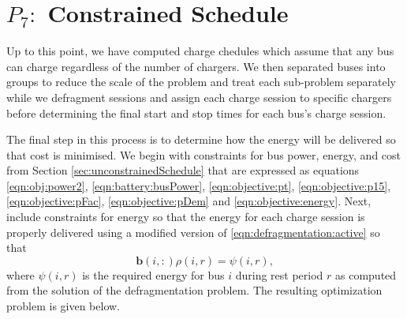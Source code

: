 \section{$P_7:$ Constrained Schedule\label{sec:constrainedSchedule}}
Up to this point, we have computed charge chedules which assume that any bus can charge regardless of the number of chargers. We then separated buses into groups to reduce the scale of the problem and treat each sub-problem separately while we defragment sessions and assign each charge session to specific chargers before determining the final start and stop times for each bus's charge session.
\par The final step in this process is to determine how the energy will be delivered so that cost is minimised. We begin with constraints for bus power, energy, and cost from Section \ref{sec:unconstrainedSchedule} that are expressed as equations \eqref{eqn:obj:power2}, \eqref{eqn:battery:busPower}, \eqref{eqn:objective:pt}, \eqref{eqn:objective:p15}, \eqref{eqn:objective:pFac}, \eqref{eqn:objective:pDem} and \eqref{eqn:objective:energy}. Next, include constraints for energy so that the energy for each charge session is properly delivered using a modified version of \eqref{eqn:defragmentation:active} so that
\begin{equation}\label{eqn:constrainedSchedule:modified}
	\mathbf{b}(i,:)\rho(i,r) = \psi(i,r),
\end{equation}
where $\psi(i,r)$ is the required energy for bus $i$ during rest period $r$ as computed from the solution of the defragmentation problem.  The resulting optimization problem is given below.\\[0.1in]

